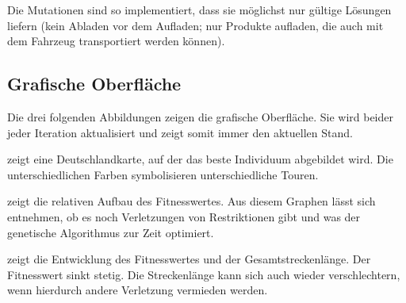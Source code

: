 Die Mutationen sind so implementiert, dass sie möglichst nur gültige Lösungen liefern (kein Abladen vor dem Aufladen; nur Produkte aufladen, die auch mit dem Fahrzeug transportiert werden können). 


\newpage
\subsection{Grafische Oberfläche}
\label{sec:GrafischeOberflaeche}
Die drei folgenden Abbildungen zeigen die grafische Oberfläche. Sie wird beider jeder Iteration aktualisiert und zeigt somit immer den aktuellen Stand.

 zeigt eine Deutschlandkarte, auf der das beste Individuum abgebildet wird. Die unterschiedlichen Farben symbolisieren unterschiedliche Touren.

 zeigt die relativen Aufbau des Fitnesswertes. Aus diesem Graphen lässt sich entnehmen, ob es noch Verletzungen von Restriktionen gibt und was der genetische Algorithmus zur Zeit optimiert.

 zeigt die Entwicklung des Fitnesswertes und der Gesamtstreckenlänge. Der Fitnesswert sinkt stetig. Die Streckenlänge kann sich auch wieder verschlechtern, wenn hierdurch andere Verletzung vermieden werden.



